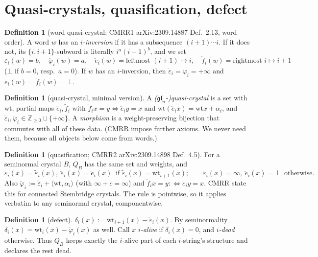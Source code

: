 \documentclass[11pt]{amsart}
\theoremstyle{definition}
\newtheorem{definition}[theorem]{Definition}
\theoremstyle{remark}
\newcommand{\ee}{\ddot e}
\newcommand{\ff}{\ddot f}
\newcommand{\eps}{\ddot\varepsilon}
\newcommand{\vphi}{\ddot\varphi}
\newcommand{\te}{\tilde e}
\newcommand{\teps}{\tilde\varepsilon}
\newcommand{\tphi}{\tilde\varphi}
\newcommand{\wt}{\mathrm{wt}}
\begin{document}
\section{Quasi-crystals, quasification, defect}

\begin{definition}[word quasi-crystal; CMRR1 arXiv:2309.14887 Def.~2.13, word order]\label{def:wordqc}
A word $w$ has an \emph{$i$-inversion} if it has a subsequence $(i+1)\cdots i$. If it does not, its $\{i,i+1\}$-subword is literally $i^a(i+1)^b$, and we set
\[\eps_i(w)=b,\quad \vphi_i(w)=a,\quad \ee_i(w)=\text{leftmost }(i+1)\mapsto i,\quad \ff_i(w)=\text{rightmost } i\mapsto i+1\]
($\bot$ if $b=0$, resp.\ $a=0$). If $w$ has an $i$-inversion, then $\eps_i=\vphi_i=+\infty$ and $\ee_i(w)=\ff_i(w)=\bot$.
\end{definition}

\begin{definition}[quasi-crystal, minimal version]
A \emph{($\mathfrak{gl}_n$-)quasi-crystal} is a set with $\wt$, partial maps $\ee_i,\ff_i$ with $\ff_ix=y\iff\ee_iy=x$ and $\wt(\ee_ix)=\wt x+\alpha_i$, and $\eps_i,\vphi_i\in\mathbb Z_{\ge0}\sqcup\{+\infty\}$. A \emph{morphism} is a weight-preserving bijection that commutes with all of these data. (CMRR impose further axioms. We never need them, because all objects below come from words.)
\end{definition}

\begin{definition}[quasification; CMRR2 arXiv:2309.14898 Def.~4.5]\label{def:Q}
For a seminormal crystal $B$, $Q_B$ has the same set and weights, and
\[\eps_i(x)=\teps_i(x),\ \ee_i(x)=\te_i(x)\ \text{ if }\teps_i(x)=\wt_{i+1}(x);\qquad \eps_i(x)=\infty,\ \ee_i(x)=\bot\ \text{ otherwise}.\]
Also $\vphi_i:=\eps_i+\langle\wt,\alpha_i\rangle$ (with $\infty+c=\infty$) and $\ff_i x=y:\iff\ee_iy=x$. CMRR state this for connected Stembridge crystals. The rule is pointwise, so it applies verbatim to any seminormal crystal, componentwise.
\end{definition}

\begin{definition}[defect]
$\delta_i(x):=\wt_{i+1}(x)-\teps_i(x)$. By seminormality $\delta_i(x)=\wt_i(x)-\tphi_i(x)$ as well. Call $x$ \emph{$i$-alive} if $\delta_i(x)=0$, and \emph{$i$-dead} otherwise. Thus $Q_B$ keeps exactly the $i$-alive part of each $i$-string's structure and declares the rest dead.
\end{definition}
\end{document}
